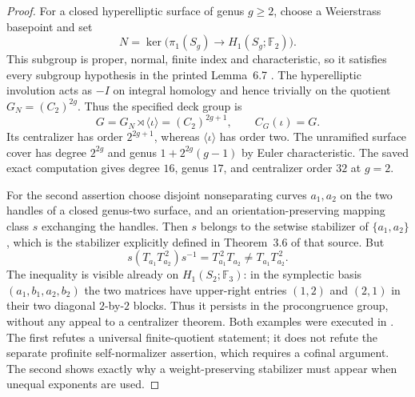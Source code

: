 \begin{proof}
For a closed hyperelliptic surface of genus $g\geq2$, choose a Weierstrass basepoint and set
\[
 N=\ker\bigl(\pi_1(S_g)\longrightarrow H_1(S_g;\mathbb F_2)\bigr).
\]
This subgroup is proper, normal, finite index and characteristic, so it satisfies every subgroup hypothesis in the printed Lemma~6.7 \cite[pp.~26--27]{D_Boggi2020}. The hyperelliptic involution acts as $-I$ on integral homology and hence trivially on the quotient
$G_N=(C_2)^{2g}$. Thus the specified deck group is
\[
 G=G_N\rtimes\langle\iota\rangle
   =(C_2)^{2g+1},\qquad C_G(\iota)=G.
\]
Its centralizer has order $2^{2g+1}$, whereas $\langle\iota\rangle$ has order two. The unramified surface cover has degree $2^{2g}$ and genus $1+2^{2g}(g-1)$ by Euler characteristic. The saved exact computation gives degree $16$, genus $17$, and centralizer order $32$ at $g=2$.

For the second assertion choose disjoint nonseparating curves $a_1,a_2$ on the two handles of a closed genus-two surface, and an orientation-preserving mapping class $s$ exchanging the handles. Then $s$ belongs to the setwise stabilizer of $\{a_1,a_2\}$, which is the stabilizer explicitly defined in Theorem~3.6 of that source. But
\[
 s(T_{a_1}T_{a_2}^{\,2})s^{-1}
     =T_{a_1}^{\,2}T_{a_2}
     \ne T_{a_1}T_{a_2}^{\,2}.
\]
The inequality is visible already on $H_1(S_2;\mathbb F_3)$: in the symplectic basis $(a_1,b_1,a_2,b_2)$ the two matrices have upper-right entries $(1,2)$ and $(2,1)$ in their two diagonal $2$-by-$2$ blocks. Thus it persists in the procongruence group, without any appeal to a centralizer theorem. Both examples were executed in . The first refutes a universal finite-quotient statement; it does not refute the separate profinite self-normalizer assertion, which requires a cofinal argument. The second shows exactly why a weight-preserving stabilizer must appear when unequal exponents are used.
\end{proof}

